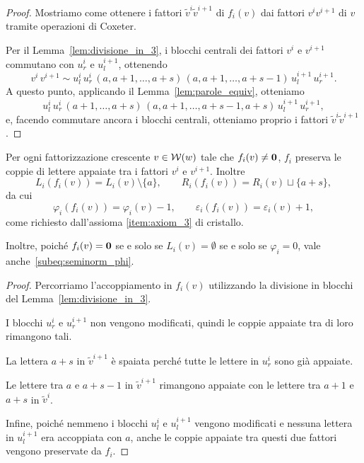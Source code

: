 \begin{proof}

    Mostriamo come ottenere i fattori $\tilde{v}^i  \tilde{v}^{i+1}$ di $f_i (v)$ dai
    fattori $v^i  v^{i+1}$ di $v$ tramite operazioni di Coxeter.

    Per il Lemma~\ref{lem:divisione_in_3}, i blocchi centrali dei
    fattori $v^i$ e $v^{i+1}$ commutano con 
    $u^i_r$ e $u^{i+1}_l$, ottenendo
    \[
        v^i \, v^{i+1} \sim 
        u^i_l \, u^i_r \,
        ( a, a+1, \dots , a+s ) \,
        (a, a+1, \dots, a+s-1 )
        \, u^{i+1}_l \, u^{i+1}_r.
    \]
    A questo punto, applicando il Lemma~\ref{lem:parole_equiv},
    otteniamo
    \[
        u^i_l \, u^i_r \,
        ( a+1, \dots , a+s ) \,
        (a, a+1, \dots, a+s-1, a+s )
        \, u^{i+1}_l \, u^{i+1}_r,
    \]
    e, facendo commutare ancora i blocchi centrali, otteniamo proprio
    i fattori $\tilde{v}^i  \tilde{v}^{i+1}$.
\end{proof}

\begin{proposition}
    Per ogni fattorizzazione crescente $v \in \operatorname{\mathcal{W}}(w)$ tale che $f_i (v) \neq \mathbf{0}$,
    $f_i$ preserva le coppie di lettere appaiate tra i fattori $v^i$ e $v^{i+1}$.
    Inoltre
    \[
        L_i (f_i (v)) = L_i ( v) \setminus \{ a \}, \qquad 
        R_i (f_i (v)) = R_i (v ) \sqcup \{ a + s \},
    \]
    da cui
    \[
        \varphi_i (f_i (v)) = \varphi_i (v) -1, \qquad
        \varepsilon_i (f_i (v)) = \varepsilon_i (v) +1,
    \]
    come richiesto dall'assioma \ref{item:axiom_3} di cristallo.
    
    Inoltre, poich\'e $f_i(v) = \mathbf{0}$ se e solo se 
    $L_i(v) = \emptyset$ se e solo se $\varphi_i = 0$,
    vale anche~\eqref{subeq:seminorm_phi}.
\end{proposition}

\begin{proof}
    Percorriamo l'accoppiamento in $f_i (v)$ utilizzando la divisione in blocchi del
    Lemma~\ref{lem:divisione_in_3}.

    I blocchi $u^i_r$ e $u^{i+1}_r$ non vengono modificati, quindi le coppie appaiate
    tra di loro rimangono tali.

    La lettera $a+s$ in $\tilde{v}^{i+1}$ \`e spaiata perch\'e tutte le lettere in $u^i_r$ sono 
    gi\`a appaiate.

    Le lettere tra $a$ e $a+s-1$ in $\tilde{v}^{i+1}$ rimangono appaiate con le lettere 
    tra $a+1$ e $a+s$ in $\tilde{v}^i$.

    Infine, poich\'e nemmeno i blocchi $u^i_l$ e $u^{i+1}_l$ vengono modificati e 
    nessuna lettera in $u^{i+1}_l$ era accoppiata con $a$, anche le coppie appaiate tra
    questi due fattori vengono preservate da $f_i$.
\end{proof}

